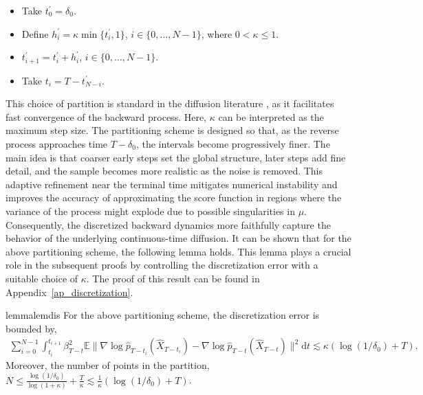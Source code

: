 \documentclass[12pts]{article}
\newcommand{\diff}{\mathrm{d}}
\newcommand{\hX}{ \widehat{X}}
\newcommand{\E}{\mathbb{E}}
\newcommand{\hp}{\hat{p}}
\begin{document}
  \begin{itemize}
      \item Take $t_0^\prime = \delta_0$.
      \item Define $h_i^\prime = \kappa \min\{t_i^\prime, 1\}$, $i \in \{0, \dots , N-1\}$, where $0 < \kappa \le 1$.
      \item $t_{i+1}^\prime = t_i^\prime + h_i^\prime$, $i \in \{0, \dots , N-1\}$.
      \item Take $t_i = T - t^\prime_{N-i}$.
  \end{itemize}
  This choice of partition is standard in the diffusion literature \citep{chen2023improved, benton2024nearly, huang2024denoising, potaptchik2024linear}, as it facilitates fast convergence of the backward process. Here, $\kappa$ can be interpreted as the maximum step size. The partitioning scheme is designed so that, as the reverse process approaches time $T - \delta_0$, the intervals become progressively finer. The main idea is that coarser early steps set
the global structure, later steps add fine detail, and the sample becomes more
realistic as the noise is removed. This adaptive refinement near the terminal time mitigates numerical instability and improves the accuracy of approximating the score function in regions where the variance of the process might explode due to possible singularities in $\mu$. Consequently, the discretized backward dynamics more faithfully capture the behavior of the underlying continuous-time diffusion. It can be shown that for the above partitioning scheme, the following lemma holds. This lemma plays a crucial role in the subsequent proofs by controlling the discretization error with a suitable choice of $\kappa$. The proof of this result can be found in Appendix~\ref{ap_discretization}.

  \begin{restatable}{lemma}{lemdis}\label{lemdis}
  For the above partitioning scheme, the discretization error is bounded by, 
      \begin{align}
    \sum_{i=0}^{N-1}\int_{t_i}^{t_{i+1}} \beta^2_{T-t} \E \|\nabla \log \hp_{T-t_i}(\hX_{T-t_i}) - \nabla \log \hp_{T-t}(\hX_{T-t})\|^2 \diff  t 
    \lesssim \kappa \left(\log(1/\delta_0) + T \right) . \label{e_dis}
\end{align}
Moreover, the number of points in the partition, $N \le \frac{\log(1/\delta_0)}{\log(1+\kappa)} +  \frac{T}{\kappa} \lesssim \frac{1}{\kappa}\left(\log(1/\delta_0) + T \right)$.
  \end{restatable}
\end{document}
